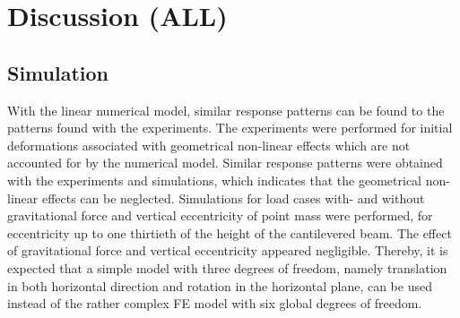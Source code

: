 \documentclass{article}
\begin{document}
\section{Discussion (ALL)}
\label{sec:discussion}

\subsection{Simulation}
With the linear numerical model, similar response patterns can be found to the patterns found with the experiments. The experiments were performed for initial deformations associated with geometrical non-linear effects which are not accounted for by the numerical model. Similar response patterns were obtained with the experiments and simulations, which indicates that the geometrical non-linear effects can be neglected. Simulations for load cases with- and without gravitational force and vertical eccentricity of point mass were performed, for eccentricity up to one thirtieth of the height of the cantilevered beam. The effect of  gravitational force and vertical eccentricity appeared negligible. Thereby, it is expected that a simple model with three degrees of freedom, namely translation in both horizontal direction and rotation in the horizontal plane, can be used instead of the rather complex FE model with six global degrees of freedom.
\end{document}
